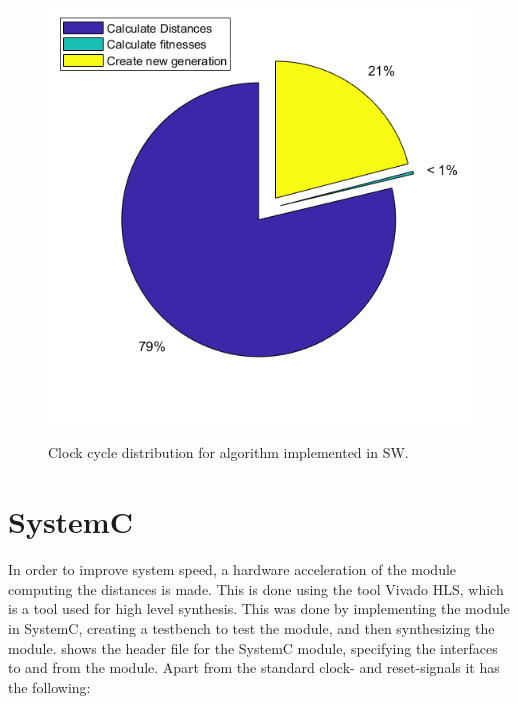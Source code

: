 \begin{figure}[H]
	\centering
	{\includegraphics[width=\textwidth/2]{Images/timing_pieChart.png}}\\[0.5cm]
	\caption{Clock cycle distribution for algorithm implemented in SW.}
	\label{fig:algo_test_sw_pie}
\end{figure}

\section{SystemC}
In order to improve system speed, a hardware acceleration of the module computing the distances is made. This is done using the tool Vivado HLS, which is a tool used for high level synthesis. This was done by implementing the module in SystemC, creating a testbench to test the module, and then synthesizing the module.  shows the header file for the SystemC module, specifying the interfaces to and from the module. Apart from the standard clock- and reset-signals it has the following:

